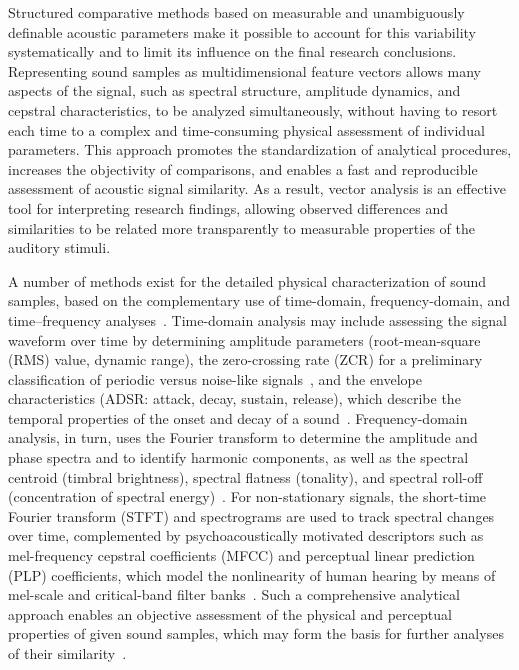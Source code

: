 \documentclass[doubleblind,preprint,12pt]{elsarticle}
\begin{document}
Structured comparative methods based on measurable and unambiguously definable acoustic parameters make it possible to account for this variability systematically and to limit its influence on the final research conclusions. Representing sound samples as multidimensional feature vectors allows many aspects of the signal, such as spectral structure, amplitude dynamics, and cepstral characteristics, to be analyzed simultaneously, without having to resort each time to a complex and time-consuming physical assessment of individual parameters. This approach promotes the standardization of analytical procedures, increases the objectivity of comparisons, and enables a fast and reproducible assessment of acoustic signal similarity. As a result, vector analysis is an effective tool for interpreting research findings, allowing observed differences and similarities to be related more transparently to measurable properties of the auditory stimuli.

A number of methods exist for the detailed physical characterization of sound samples, based on the complementary use of time-domain, frequency-domain, and time--frequency analyses~\cite{Letowski1989SoundQuality,Peeters2004CUIDADO}. Time-domain analysis may include assessing the signal waveform over time by determining amplitude parameters (root-mean-square (RMS) value, dynamic range), the zero-crossing rate (ZCR) for a preliminary classification of periodic versus noise-like signals~\cite{Gouyon2000}, and the envelope characteristics (ADSR: attack, decay, sustain, release), which describe the temporal properties of the onset and decay of a sound~\cite{Peeters2004CUIDADO}. Frequency-domain analysis, in turn, uses the Fourier transform to determine the amplitude and phase spectra and to identify harmonic components, as well as the spectral centroid (timbral brightness), spectral flatness (tonality), and spectral roll-off (concentration of spectral energy)~\cite{Peeters2004CUIDADO,saitis2020brightness}.
For non-stationary signals, the short-time Fourier transform (STFT) and spectrograms are used to track spectral changes over time, complemented by psychoacoustically motivated descriptors such as mel-frequency cepstral coefficients (MFCC) and perceptual linear prediction (PLP) coefficients, which model the nonlinearity of human hearing by means of mel-scale and critical-band filter banks~\cite{Hermansky1990,tracey2023interpretable_mfcc}.
Such a comprehensive analytical approach enables an objective assessment of the physical and perceptual properties of given sound samples, which may form the basis for further analyses of their similarity~\cite{Peeters2004CUIDADO}.
\end{document}
